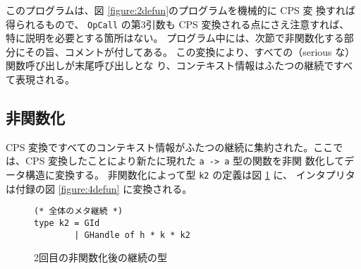 このプログラムは、図 \ref{figure:2defun}のプログラムを機械的に CPS 変
換すれば得られるもので、
\texttt{OpCall} の第3引数も CPS 変換される点にさえ注意すれば、
特に説明を必要とする箇所はない。
プログラム中には、次節で非関数化する部分にその旨、コメントが付してある。
この変換により、すべての（serious な）関数呼び出しが末尾呼び出しとな
り、コンテキスト情報はふたつの継続ですべて表現される。

\subsection{非関数化}
\label{subsection:4defun}

CPS 変換ですべてのコンテキスト情報がふたつの継続に集約された。ここで
は、CPS 変換したことにより新たに現れた \texttt{a -> a} 型の関数を非関
数化してデータ構造に変換する。
非関数化によって型 \texttt{k2} の定義は図 \ref{figure:k2_4defun} に、
インタプリタは付録の図 \ref{figure:4defun} に変換される。


\begin{figure}
\begin{verbatim}
(* 全体のメタ継続 *)
type k2 = GId
        | GHandle of h * k * k2
\end{verbatim}
\caption{2回目の非関数化後の継続の型}
\label{figure:k2_4defun}
\end{figure}

